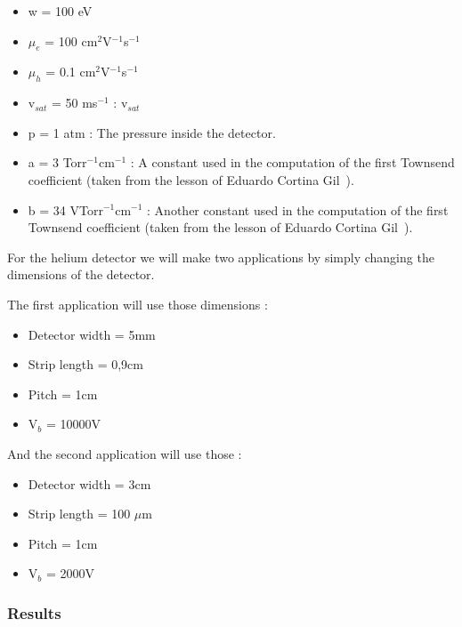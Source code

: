 \documentclass[11pt]{article}
\begin{document}
				\begin{itemize}

					\item w = 100 eV
					\item $\mu_e$ = 100 cm$^2$V$^{-1}$s$^{-1}$
					\item $\mu_h$ = 0.1 cm$^2$V$^{-1}$s$^{-1}$
					\item v$_{sat}$ = 50 ms$^{-1}$ : v$_{sat}$
					\item p = 1 atm : The pressure inside the detector.
					\item a = 3 Torr$^{-1}$cm$^{-1}$ : A constant used in the computation of the first
						Townsend coefficient (taken from the lesson of Eduardo Cortina Gil~\cite{lphy2236}).
					\item b = 34 VTorr$^{-1}$cm$^{-1}$ : Another constant used in the computation of the
						first Townsend coefficient (taken from the lesson of Eduardo Cortina Gil~\cite{lphy2236}).

				\end{itemize}

				For the helium detector we will make two applications by simply changing the dimensions of
				the detector.

				The first application will use those dimensions :
				\begin{itemize}

					\item Detector width = 5mm
					\item Strip length = 0,9cm
					\item Pitch = 1cm
					\item V$_b$ = 10000V

				\end{itemize}

				And the second application will use those :

				\begin{itemize}

					\item Detector width = 3cm
					\item Strip length = 100 $\mu$m
					\item Pitch = 1cm
					\item V$_b$ = 2000V

				\end{itemize}

			\subsubsection*{Results}
\end{document}
